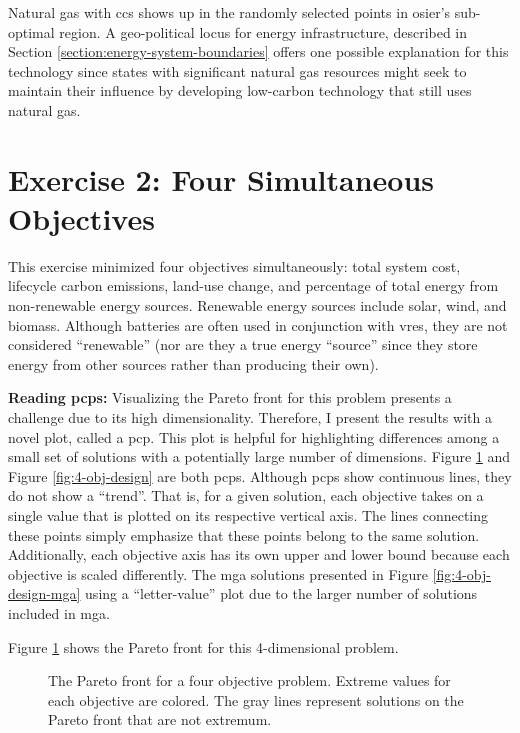 Natural gas with \ac{ccs} shows up in the randomly selected points in
\ac{osier}'s sub-optimal region. A geo-political locus for energy
infrastructure, described in Section \ref{section:energy-system-boundaries}
offers one possible explanation for this technology since states with
significant natural gas resources might seek to maintain their influence by
developing low-carbon technology that still uses natural gas.


\section{Exercise 2: Four Simultaneous Objectives}
This exercise minimized four objectives simultaneously: total system cost, 
lifecycle carbon emissions, land-use change, and percentage of total energy
from non-renewable energy sources. Renewable energy sources include solar,
wind, and biomass. Although batteries are often used in conjunction with
\acp{vre}, they are not considered ``renewable'' (nor are they a true energy
``source'' since they store energy from other sources rather than producing
their own).

\begin{noteBox}
\textbf{Reading \Aclp{pcp}:}
Visualizing the Pareto front for this problem presents a challenge due to its
high dimensionality. Therefore, I present the results with a novel plot, called
a \ac{pcp}. This plot is helpful for highlighting differences among a small set
of solutions with a potentially large number of dimensions. Figure \ref{fig:4-obj-pareto} 
and Figure \ref{fig:4-obj-design} are both \acp{pcp}. Although \acp{pcp} show continuous
lines, they do not show a ``trend''. That is, for a given solution, each objective
takes on a single value that is plotted on its respective vertical axis. The lines 
connecting these points simply emphasize that these points belong to the same solution.
Additionally, each objective axis has its own upper and lower bound because each objective
is scaled differently.
The \ac{mga} solutions presented in Figure \ref{fig:4-obj-design-mga} using a 
``letter-value'' plot due to the larger number of solutions included in \ac{mga}. 
\end{noteBox}

Figure \ref{fig:4-obj-pareto} shows the Pareto front for this 4-dimensional problem.


\begin{figure}[h]
  \centering
  \resizebox{\columnwidth}{!}{}
  \caption{The Pareto front for a four objective problem. Extreme values for each
  objective are colored. The gray lines represent solutions on the Pareto front 
  that are not extremum.}
  \label{fig:4-obj-pareto}
\end{figure}


